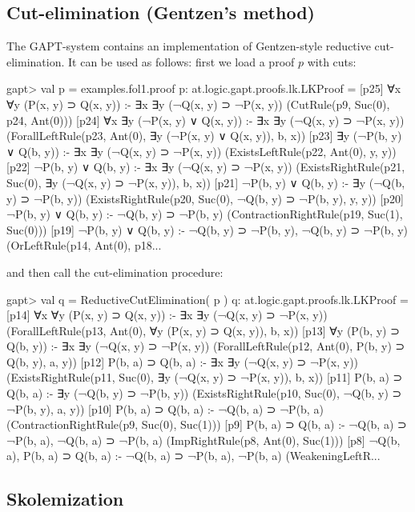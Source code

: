 \documentclass[a4paper,11pt]{article}
\begin{document}
\subsection{Cut-elimination (Gentzen's method)}

The GAPT-system contains an implementation of Gentzen-style reductive
cut-elimination.  It can be used as follows: first we load a proof $p$ with
cuts:

\begin{clilisting}
gapt> val p = examples.fol1.proof
p: at.logic.gapt.proofs.lk.LKProof =
[p25] ∀x ∀y (P(x, y) ⊃ Q(x, y)) :- ∃x ∃y (¬Q(x, y) ⊃ ¬P(x, y))    (CutRule(p9, Suc(0), p24, Ant(0)))
[p24] ∀x ∃y (¬P(x, y) ∨ Q(x, y)) :- ∃x ∃y (¬Q(x, y) ⊃ ¬P(x, y))    (ForallLeftRule(p23, Ant(0), ∃y (¬P(x, y) ∨ Q(x, y)), b, x))
[p23] ∃y (¬P(b, y) ∨ Q(b, y)) :- ∃x ∃y (¬Q(x, y) ⊃ ¬P(x, y))    (ExistsLeftRule(p22, Ant(0), y, y))
[p22] ¬P(b, y) ∨ Q(b, y) :- ∃x ∃y (¬Q(x, y) ⊃ ¬P(x, y))    (ExistsRightRule(p21, Suc(0), ∃y (¬Q(x, y) ⊃ ¬P(x, y)), b, x))
[p21] ¬P(b, y) ∨ Q(b, y) :- ∃y (¬Q(b, y) ⊃ ¬P(b, y))    (ExistsRightRule(p20, Suc(0), ¬Q(b, y) ⊃ ¬P(b, y), y, y))
[p20] ¬P(b, y) ∨ Q(b, y) :- ¬Q(b, y) ⊃ ¬P(b, y)    (ContractionRightRule(p19, Suc(1), Suc(0)))
[p19] ¬P(b, y) ∨ Q(b, y) :- ¬Q(b, y) ⊃ ¬P(b, y), ¬Q(b, y) ⊃ ¬P(b, y)    (OrLeftRule(p14, Ant(0), p18...
\end{clilisting}
%
and then call the cut-elimination procedure:
\begin{clilisting}
gapt> val q = ReductiveCutElimination( p )
q: at.logic.gapt.proofs.lk.LKProof =
[p14] ∀x ∀y (P(x, y) ⊃ Q(x, y)) :- ∃x ∃y (¬Q(x, y) ⊃ ¬P(x, y))    (ForallLeftRule(p13, Ant(0), ∀y (P(x, y) ⊃ Q(x, y)), b, x))
[p13] ∀y (P(b, y) ⊃ Q(b, y)) :- ∃x ∃y (¬Q(x, y) ⊃ ¬P(x, y))    (ForallLeftRule(p12, Ant(0), P(b, y) ⊃ Q(b, y), a, y))
[p12] P(b, a) ⊃ Q(b, a) :- ∃x ∃y (¬Q(x, y) ⊃ ¬P(x, y))    (ExistsRightRule(p11, Suc(0), ∃y (¬Q(x, y) ⊃ ¬P(x, y)), b, x))
[p11] P(b, a) ⊃ Q(b, a) :- ∃y (¬Q(b, y) ⊃ ¬P(b, y))    (ExistsRightRule(p10, Suc(0), ¬Q(b, y) ⊃ ¬P(b, y), a, y))
[p10] P(b, a) ⊃ Q(b, a) :- ¬Q(b, a) ⊃ ¬P(b, a)    (ContractionRightRule(p9, Suc(0), Suc(1)))
[p9] P(b, a) ⊃ Q(b, a) :- ¬Q(b, a) ⊃ ¬P(b, a), ¬Q(b, a) ⊃ ¬P(b, a)    (ImpRightRule(p8, Ant(0), Suc(1)))
[p8] ¬Q(b, a), P(b, a) ⊃ Q(b, a) :- ¬Q(b, a) ⊃ ¬P(b, a), ¬P(b, a)    (WeakeningLeftR...
\end{clilisting}


\subsection{Skolemization}
\end{document}

